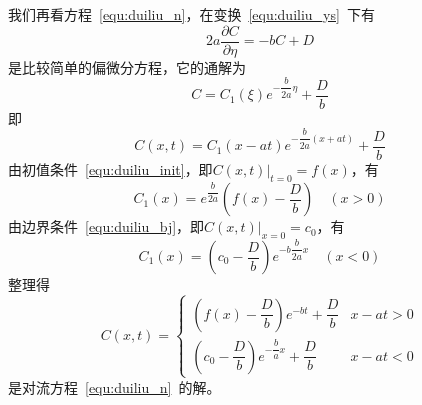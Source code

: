 我们再看方程~\eqref{equ:duiliu_n}，在变换~\eqref{equ:duiliu_ys}~下有
\begin{equation}
2a\dfrac{\partial C}{\partial \eta} = -bC+D
\end{equation}
是比较简单的偏微分方程，它的通解为
\begin{equation}
C=C_1(\xi)e^{-\dfrac{b}{2a}\eta}+\dfrac{D}{b}
\end{equation}
即
\begin{equation}
C(x,t)=C_1(x-at)e^{-\dfrac{b}{2a}(x+at)}+\dfrac{D}{b}
\end{equation}
由初值条件~\eqref{equ:duiliu_init}，即$\left.C(x,t)\right|_{t=0}=f(x)$，有
\begin{equation}
C_1(x)=e^{\dfrac{b}{2a}}\left(f(x)-\dfrac{D}{b}\right)\quad(x>0)
\end{equation}
由边界条件~\eqref{equ:duiliu_bj}，即$\left.C(x,t)\right|_{x=0}=c_0$，有
\begin{equation}
C_1(x)=\left(c_0-\dfrac{D}{b}\right)e^{-b\dfrac{b}{2a}x}\quad(x<0)
\end{equation}
整理得
\begin{equation}
C(x,t)=
\begin{cases}
\left(f(x)-\dfrac{D}{b}\right)e^{-bt}+\dfrac{D}{b}  & x-at>0 \\
\left(c_0-\dfrac{D}{b}\right)e^{-\dfrac{b}{a}x}+\dfrac{D}{b}	&x-at<0
\end{cases}
\end{equation}
是对流方程~\eqref{equ:duiliu_n}~的解。

